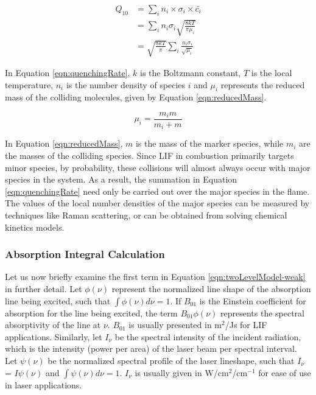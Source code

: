 \begin{align}
  Q_{10} &= \sum_i n_i \times \sigma_i \times \bar{c_i} \nonumber \\
  & = \sum_i n_i \sigma_i \sqrt{\frac{8kT}{\pi\mu_i}} \nonumber \\
  & = \sqrt{\frac{8kT}{\pi}} \sum_i \frac{n_i \sigma_i}{\sqrt{\mu_i}}
  \label{eqn:quenchingRate}
\end{align}


In Equation \ref{eqn:quenchingRate}, \(k\) is the Boltzmann constant, \(T\) is the local temperature, \(n_i\) is the number density of species \(i\) and \(\mu_i\) represents the reduced mass of the colliding molecules, given by Equation \ref{eqn:reducedMass}.

\begin{equation}
  \mu_i = \frac{ m_i m }{ m_i + m }
  \label{eqn:reducedMass}
\end{equation}


In Equation \ref{eqn:reducedMass}, \(m\) is the mass of the marker species, while \(m_i\) are the masses of the colliding species.
Since LIF in combustion primarily targets minor species, by probability, these collisions will almost always occur with major species in the system.
As a result, the summation in Equation \ref{eqn:quenchingRate} need only be carried out over the major species in the flame.
The values of the local number densities of the major species can be measured by techniques like Raman scattering, or can be obtained from solving chemical kinetics models.

\subsubsection{Absorption Integral Calculation}
\label{subsubsec:basic-model-absorption-integral-calculation}

Let us now briefly examine the first term in Equation \ref{eqn:twoLevelModel-weak} in further detail.
Let \(\phi(\nu)\) represent the normalized line shape of the absorption line being excited, such that \(\int \phi(\nu) d\nu = 1\).
If \(B_{01}\) is the Einstein coefficient for absorption for the line being excited, the term \(B_{01}\phi(\nu)\) represents the spectral absorptivity of the line at \(\nu\).
\(B_{01}\) is usually presented in m\(^2\)/Js for LIF applications.
Similarly, let \(I_\nu\) be the spectral intensity of the incident radiation, which is the intensity (power per area) of the laser beam per spectral interval.
Let \(\psi(\nu)\) be the normalized spectral profile of the laser lineshape, such that \(I_\nu\) = \(I \psi(\nu)\) and \(\int \psi(\nu) d\nu = 1\).
\(I_\nu\) is usually given in W/cm\(^2\)/cm\(^{-1}\) for ease of use in laser applications.

